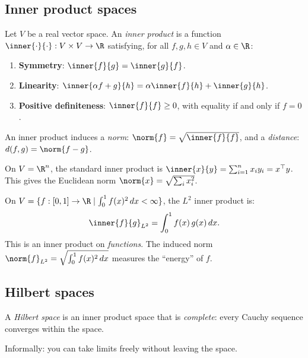 \begin{notechapter}
\subsection{Inner product spaces}
\label{rkhs:subsec:inner_product}

\begin{definition}
Let $V$ be a real vector space. An \emph{inner product} is a function
$\inner{\cdot}{\cdot}: V \times V \to \R$ satisfying, for all $f, g, h
\in V$ and $\alpha \in \R$:
\begin{enumerate}[label=(\roman*)]
  \item \textbf{Symmetry}: $\inner{f}{g} = \inner{g}{f}$.
  \item \textbf{Linearity}: $\inner{\alpha f + g}{h} =
  \alpha\inner{f}{h} + \inner{g}{h}$.
  \item \textbf{Positive definiteness}: $\inner{f}{f} \geq 0$, with
  equality if and only if $f = 0$.
\end{enumerate}
An inner product induces a \emph{norm}: $\norm{f} =
\sqrt{\inner{f}{f}}$, and a \emph{distance}: $d(f,g) = \norm{f - g}$.
\end{definition}

\begin{example}
On $V = \R^n$, the standard inner product is $\inner{x}{y} =
\sum_{i=1}^n x_i y_i = x^\top y$. This gives the Euclidean norm
$\norm{x} = \sqrt{\sum_i x_i^2}$.
\end{example}

\begin{example}
On $V = \{f:[0,1] \to \R \mid \int_0^1 f(x)^2\,dx < \infty\}$, the $L^2$
inner product is:
\[
\inner{f}{g}_{L^2} = \int_0^1 f(x)\,g(x)\,dx.
\]
This is an inner product on \emph{functions}. The induced norm
$\norm{f}_{L^2} = \sqrt{\int_0^1 f(x)^2\,dx}$ measures the ``energy'' of
$f$.
\end{example}

\subsection{Hilbert spaces}
\label{rkhs:subsec:hilbert}

\begin{definition}
A \emph{Hilbert space} is an inner product space that is
\emph{complete}: every Cauchy sequence converges within the space.

Informally: you can take limits freely without leaving the space.
\end{definition}


\end{notechapter}
